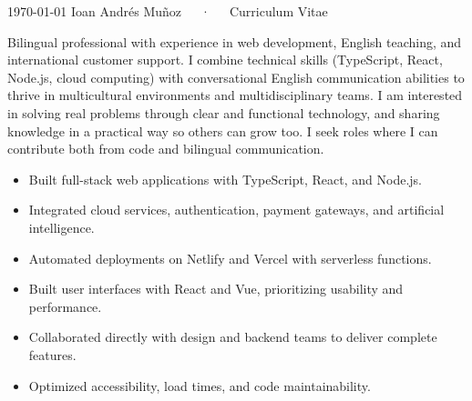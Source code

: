 \documentclass[11pt, a4paper]{awesome-cv}
\begin{document}
\makecvheader[C]

\makecvfooter
  {\today}
  {Ioan Andrés Muñoz~~~·~~~Curriculum Vitae}
  {\thepage}


Bilingual professional with experience in web development, English teaching, and international customer support. I combine technical skills (TypeScript, React, Node.js, cloud computing) with conversational English communication abilities to thrive in multicultural environments and multidisciplinary teams. I am interested in solving real problems through clear and functional technology, and sharing knowledge in a practical way so others can grow too. I seek roles where I can contribute both from code and bilingual communication.


\begin{itemize}
  \item Built full-stack web applications with TypeScript, React, and Node.js.
  \item Integrated cloud services, authentication, payment gateways, and artificial intelligence.
  \item Automated deployments on Netlify and Vercel with serverless functions.
\end{itemize}

\begin{itemize}
  \item Built user interfaces with React and Vue, prioritizing usability and performance.
  \item Collaborated directly with design and backend teams to deliver complete features.
  \item Optimized accessibility, load times, and code maintainability.
\end{itemize}

\end{document}
